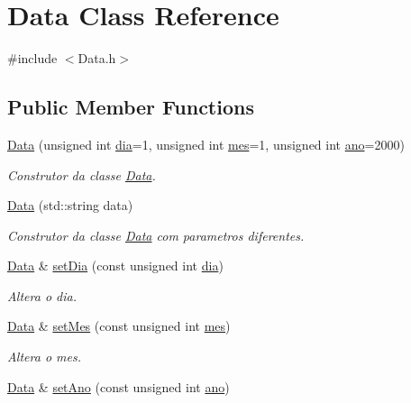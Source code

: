 \hypertarget{class_data}{}\section{Data Class Reference}
\label{class_data}


{\ttfamily \#include $<$Data.\+h$>$}

\subsection*{Public Member Functions}
\begin{DoxyCompactItemize}
\item 
\mbox{\hyperlink{class_data_aef12795194c8980d7e9f563f3d9d6c8e}{Data}} (unsigned int \mbox{\hyperlink{class_data_a71a904380d17858da0b902e9a2563546}{dia}}=1, unsigned int \mbox{\hyperlink{class_data_a586deb479ec2031a0d3ceec8280f7706}{mes}}=1, unsigned int \mbox{\hyperlink{class_data_a1811fab972bdf6ed644c4eb7412bd043}{ano}}=2000)
\begin{DoxyCompactList}\small\item\em Construtor da classe \mbox{\hyperlink{class_data}{Data}}. \end{DoxyCompactList}\item 
\mbox{\hyperlink{class_data_a972911ca68256147a714d91bba1e4da2}{Data}} (std\+::string data)
\begin{DoxyCompactList}\small\item\em Construtor da classe \mbox{\hyperlink{class_data}{Data}} com parametros diferentes. \end{DoxyCompactList}\item 
\mbox{\hyperlink{class_data}{Data}} \& \mbox{\hyperlink{class_data_a3e2c5356bc8d548b75c7d085f7a7c4ee}{set\+Dia}} (const unsigned int \mbox{\hyperlink{class_data_a71a904380d17858da0b902e9a2563546}{dia}})
\begin{DoxyCompactList}\small\item\em Altera o dia. \end{DoxyCompactList}\item 
\mbox{\hyperlink{class_data}{Data}} \& \mbox{\hyperlink{class_data_ab15051ae481d89d057b22abc8152584c}{set\+Mes}} (const unsigned int \mbox{\hyperlink{class_data_a586deb479ec2031a0d3ceec8280f7706}{mes}})
\begin{DoxyCompactList}\small\item\em Altera o mes. \end{DoxyCompactList}\item 
\mbox{\hyperlink{class_data}{Data}} \& \mbox{\hyperlink{class_data_a8d4cfad647b590df436d8260000a2745}{set\+Ano}} (const unsigned int \mbox{\hyperlink{class_data_a1811fab972bdf6ed644c4eb7412bd043}{ano}})

\end{DoxyCompactItemize}
